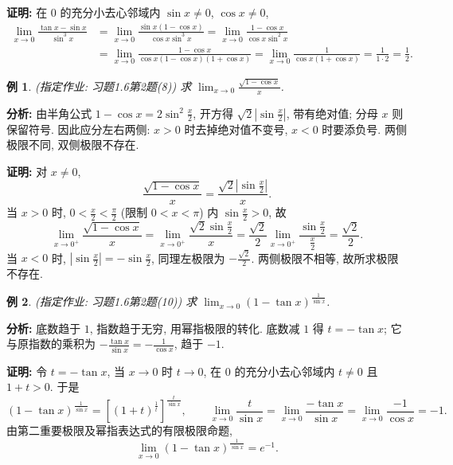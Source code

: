 \documentclass[UTF8,openany]{ctexbook}
\theoremstyle{chinesetextbook}
\newtheorem{example}{例}[section]
\newenvironment{cnproof}{\par\indent\textbf{证明:} \ignorespaces}{\par}
\begin{document}
\begin{cnproof}
在 $0$ 的充分小去心邻域内 $\sin x\ne0$, $\cos x\ne0$,
\[
\begin{aligned}
\lim_{x\to0}\frac{\tan x-\sin x}{\sin^3x}
&=\lim_{x\to0}\frac{\sin x(1-\cos x)}{\cos x\sin^3x}
=\lim_{x\to0}\frac{1-\cos x}{\cos x\sin^2x}\\
&=\lim_{x\to0}\frac{1-\cos x}{\cos x(1-\cos x)(1+\cos x)}
=\lim_{x\to0}\frac1{\cos x(1+\cos x)}=\frac1{1\cdot2}=\frac12.
\end{aligned}
\]
\end{cnproof}
\begin{example}
\textnormal{(指定作业: 习题1.6第2题(8))} 求 $\displaystyle \lim_{x\to0}\frac{\sqrt{1-\cos x}}x$.
\end{example}
\par\indent\textbf{分析:} 由半角公式 $1-\cos x=2\sin^2\frac x2$, 开方得 $\displaystyle\sqrt2\left|\sin\frac x2\right|$, 带有绝对值; 分母 $x$ 则保留符号. 因此应分左右两侧: $x>0$ 时去掉绝对值不变号, $x<0$ 时要添负号. 两侧极限不同, 双侧极限不存在.
\begin{cnproof}
对 $x\ne0$,
\[
\frac{\sqrt{1-\cos x}}x
=\frac{\sqrt2\left|\sin\frac x2\right|}{x}.
\]
当 $x>0$ 时, $\displaystyle0<\frac x2<\frac\pi2$ (限制 $0<x<\pi$) 内 $\displaystyle\sin\frac x2>0$, 故
\[
\lim_{x\to0^+}\frac{\sqrt{1-\cos x}}x
=\lim_{x\to0^+}\frac{\sqrt2\sin\frac x2}{x}
=\frac{\sqrt2}2\lim_{x\to0^+}\frac{\sin\frac x2}{\frac x2}=\frac{\sqrt2}2.
\]
当 $x<0$ 时, $\displaystyle\left|\sin\frac x2\right|=-\sin\frac x2$, 同理左极限为 $\displaystyle-\frac{\sqrt2}2$. 两侧极限不相等, 故所求极限不存在.
\end{cnproof}
\begin{example}
\textnormal{(指定作业: 习题1.6第2题(10))} 求 $\displaystyle \lim_{x\to0}(1-\tan x)^{\frac1{\sin x}}$.
\end{example}
\par\indent\textbf{分析:} 底数趋于 $1$, 指数趋于无穷, 用幂指极限的转化. 底数减 $1$ 得 $t=-\tan x$; 它与原指数的乘积为 $\displaystyle-\frac{\tan x}{\sin x}=-\frac1{\cos x}$, 趋于 $-1$.
\begin{cnproof}
令 $t=-\tan x$, 当 $x\to0$ 时 $t\to0$, 在 $0$ 的充分小去心邻域内 $t\ne0$ 且 $1+t>0$. 于是
\[
(1-\tan x)^{\frac1{\sin x}}=\left[(1+t)^{\frac1t}\right]^{\frac{t}{\sin x}},
\qquad
\lim_{x\to0}\frac{t}{\sin x}=\lim_{x\to0}\frac{-\tan x}{\sin x}=\lim_{x\to0}\frac{-1}{\cos x}=-1.
\]
由第二重要极限及幂指表达式的有限极限命题,
\[
\lim_{x\to0}(1-\tan x)^{\frac1{\sin x}}=e^{-1}.
\]
\end{cnproof}
\end{document}
